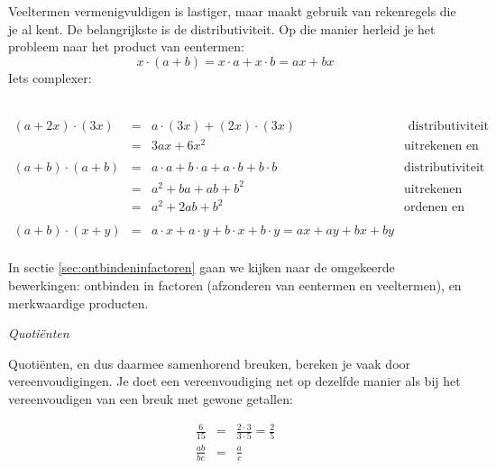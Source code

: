 	Veeltermen vermenigvuldigen is lastiger, maar maakt gebruik
	van rekenregels die je al kent. De belangrijkste is de distributiviteit.
	Op die manier herleid je het probleem naar het product van eentermen:
	\begin{equation*}
	x\cdot(a+b)=x\cdot a+x\cdot b=ax+bx
	\end{equation*}
	Iets complexer: 
	\begin{voorbeeld}
		\ \\
			\begin{math}
		\begin{array}{rcl|r}
		(a+2x)\cdot(3x) & = & a\cdot(3x)+(2x)\cdot(3x) & \text{ distributiviteit}\\
		& = & 3ax+6x^{2} & \text{uitrekenen en ordenen}\\
		& & & \\
		(a+b)\cdot(a+b) & = & a\cdot a+b\cdot a+a\cdot b+b\cdot b &  \text{distributiviteit}\\
		& = & a^{2}+ba+ab+b^{2} &  \text{uitrekenen}\\
		& = & a^{2}+2ab+b^{2} &  \text{ordenen en optellen}\\
		& &  & \\
		(a+b)\cdot(x+y) & = & a\cdot x+a\cdot y+b\cdot x+b\cdot y=ax+ay+bx+by\\
		\end{array}
		\end{math}
	\end{voorbeeld}


	In sectie \ref{sec:ontbindeninfactoren} gaan we kijken naar de omgekeerde
	bewerkingen: ontbinden in factoren (afzonderen van eentermen en veeltermen),
	en merkwaardige producten.
	
	
	\emph{Quoti\"enten}
	
	Quoti\"enten, en dus daarmee samenhorend breuken, bereken je vaak door
	vereenvoudigingen. Je doet een vereenvoudiging net op dezelfde manier
	als bij het vereenvoudigen van een breuk met gewone getallen:
	
	\begin{eqnarray*}
		\frac{6}{15} & = & \frac{2 \cdot 3}{3\cdot 5} = \frac{2}{5}\\
		\frac{ab}{bc} & = & \frac{a}{c} \\
	\end{eqnarray*}
	

